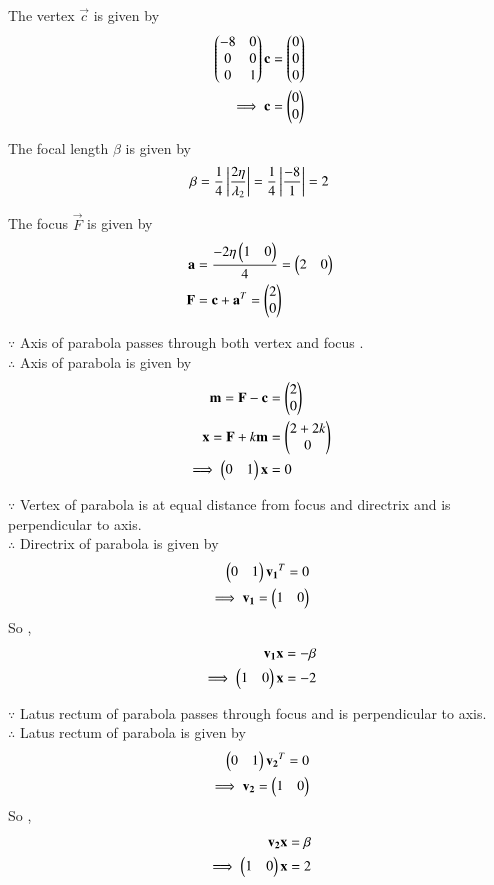 \documentclass[journal,12pt,twocolumn]{IEEEtran}
\begin{document}
The vertex $\vec{c}$ is given by
\begin{align}
\begin{pmatrix}-8 & 0\\0 & 0\\0 & 1\end{pmatrix}\mathbf{c} &= \begin{pmatrix}0\\0\\0\end{pmatrix}
\\
\implies \mathbf{c} &= \begin{pmatrix}0\\0\end{pmatrix}
\end{align}

The focal length $\beta$ is given by
\begin{align}
\beta = \frac{1}{4}\left\vert\frac{2\eta}{\lambda_2}\right\vert = \frac{1}{4}\left\vert\frac{-8}{1}\right\vert= 2
\end{align}

The focus $\vec{F}$ is given by
\begin{align}
\mathbf{a} &= \frac{-2\eta\begin{pmatrix}1 & 0\end{pmatrix}}{4} = \begin{pmatrix}2 & 0\end{pmatrix}
\\
\mathbf{F} &= \mathbf{c} + \mathbf{a}^T = \begin{pmatrix}2\\0\end{pmatrix}
\end{align}

$\because$
Axis of parabola passes through both vertex and focus .
\\
$\therefore$
Axis of parabola is given by
\begin{align}
\mathbf{m} =\mathbf{F} - \mathbf{c} &= \begin{pmatrix}2\\0\end{pmatrix}
\\
\mathbf{x} = \mathbf{F} + k\mathbf{m} &= \begin{pmatrix}2+2k \\ 0\end{pmatrix}
\\
\implies \begin{pmatrix}0 & 1\end{pmatrix}\mathbf{x} &= 0
\end{align}

$\because$
Vertex of parabola is at equal distance from focus and directrix and is perpendicular to axis.
\\
$\therefore$
Directrix of parabola is given by
\begin{align}
\begin{pmatrix}0 & 1\end{pmatrix}\mathbf{v_1}^T = 0
\\
\implies \mathbf{v_1} = \begin{pmatrix}1 & 0\end{pmatrix}
\end{align}
So , 
\begin{align}
\mathbf{v_1}\mathbf{x} = -\beta
\\
\implies \begin{pmatrix}1 & 0\end{pmatrix}\mathbf{x} = -2
\end{align}

$\because$
Latus rectum of parabola passes through focus and is perpendicular to axis.
\\
$\therefore$
Latus rectum of parabola is given by
\begin{align}
\begin{pmatrix}0 & 1\end{pmatrix}\mathbf{v_2}^T = 0
\\
\implies \mathbf{v_2} = \begin{pmatrix}1 & 0\end{pmatrix}
\end{align}
So , 
\begin{align}
\mathbf{v_2}\mathbf{x} = \beta
\\
\implies \begin{pmatrix}1 & 0\end{pmatrix}\mathbf{x} = 2
\end{align}
\end{document}
